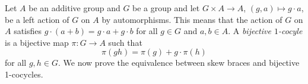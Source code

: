 %
%
%
%
%
%

Let $A$ be an additive group and $G$ be a group and let 
$G\times A\to A$, $(g,a)\mapsto g\cdot a$,
be a left action of $G$ on $A$ by automorphisms. This means that the action of $G$ on $A$ satisfies 
$g\cdot (a+b)=g\cdot a+g\cdot b$ for all $g\in G$ and $a,b\in A$.
A \emph{bijective
$1$-cocyle} is a bijective map $\pi\colon G\to A$ such that 
\begin{equation}
    \label{eq:1cocycle}
    \pi(gh)=\pi(g)+g\cdot \pi(h)
\end{equation}
for all $g,h\in G$. 
We now prove the equivalence between skew braces and bijective 1-cocycles. 

